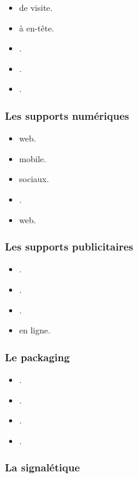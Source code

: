 \begin{itemize}
    \item {} de visite.
    \item {} à en-tête.
    \item {}.
    \item {}.
    \item {}.
\end{itemize}

\subsubsection{Les supports numériques}

\begin{itemize}
    \item {} web.
    \item {} mobile.
    \item {} sociaux.
    \item {}.
    \item {} web.
\end{itemize}

\subsubsection{Les supports publicitaires}

\begin{itemize}
    \item {}.
    \item {}.
    \item {}.
    \item {} en ligne.
\end{itemize}

\subsubsection{Le packaging}

\begin{itemize}
    \item {}.
    \item {}.
    \item {}.
    \item {}.
\end{itemize}

\subsubsection{La signalétique}

